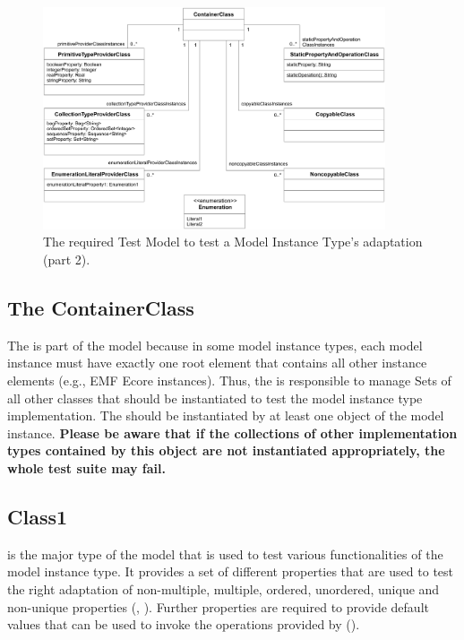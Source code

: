 \begin{figure}
  \includegraphics[width=0.9\textwidth]{figures/modelinstancetestsuite/testModel02.pdf}
	\caption{The required Test Model to test a Model Instance Type's adaptation (part 2).}
	\label{pic:modelinstancetestsuite:testModel2}
\end{figure}


\subsection{The ContainerClass}

The  is part of the model because in some model instance types, each model instance must have exactly one root element that contains all other instance elements (e.g., EMF Ecore instances). Thus, the  is responsible to manage Sets of all other classes that should be instantiated to test the model instance type implementation. The  should be instantiated by at least one object of the model instance. \textbf{Please be aware that if the collections of other implementation types contained by this object are not instantiated appropriately, the whole test suite may fail.}


\subsection{Class1}

 is the major type of the model that is used to test various functionalities of the model instance type. It provides a set of different properties that are used to test the right adaptation of non-multiple, multiple, ordered, unordered, unique and non-unique properties (, ). Further properties are required to provide default values that can be used to invoke the operations provided by  ().

